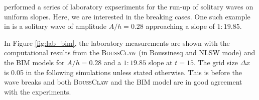 \documentclass[review]{elsarticle}
\newcommand{\BoussClaw}{\textsc{BoussClaw} }
\begin{document}
\citet{synolakis1987runup} performed a series of laboratory expseriments for the run-up of solitary waves
on uniform slopes. Here, we are interested in the  breaking cases. 
One such example in \citet{synolakis1987runup} is a solitary wave of amplitude $A/h=0.28$ 
approaching a slope of $1:19.85$. 


In Figure \ref{fig:lab_bim}, the laboratory measurements
are shown with the computational results from the \BoussClaw (in Boussinesq and NLSW mode) and the BIM models
for $A/h=0.28$ and a $1:19.85$ slope at $t=15$. 
The grid size $\Delta x$ is 0.05 in the following simulations
unless stated otherwise.
This is before the wave breaks and
both \BoussClaw and the BIM model are in good agreement with the experiments.
\end{document}
